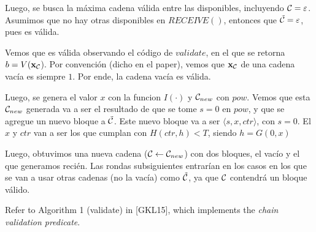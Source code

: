\documentclass[12pt,addpoints,answers]{exam}
\begin{document}
\begin{questions}
\begin{solution}
  Luego, se busca la máxima cadena válida entre las disponibles, incluyendo ${\cal C} = \varepsilon$. Asumimos que no hay otras disponibles en $RECEIVE()$, 
  entonces que ${\tilde {\cal C}} = \varepsilon$, pues es válida.

  Vemos que es válida observando el código de $validate$, en el que se retorna $ b = V(\textbf{x}_{\cal C}$). Por convención (dicho en el paper), vemos que $\textbf{x}_{\cal C}$ de una cadena vacía es siempre $1$.
  Por ende, la cadena vacía es válida.

  Luego, se genera el valor $x$ con la funcion $I(\cdot)$ y ${\cal C}_{new}$ con $pow$.
  Vemos que esta ${\cal C}_{new}$ generada va a ser el resultado de que se tome $s = 0$ en $pow$, y que se agregue un
  nuevo bloque a ${\tilde {\cal C}}$. Este nuevo bloque va a ser $\langle s, x, ctr \rangle$, con $s = 0$.
  El $x$ y $ctr$ van a ser los que cumplan con $H(ctr, h) < T$, siendo $h = G(0, x)$

  Luego, obtuvimos una nueva cadena (${\cal C} \leftarrow {\cal C}_{new}$) con dos bloques, el vacío y el que generamos recién.
  Las rondas subsiguientes entrarían en los casos en los que se van a usar otras cadenas (no la vacía) como ${\tilde{\cal C}}$, ya que
  ${\cal C}$ contendrá un bloque válido.

  
\end{solution}

\newpage

\question Refer to Algorithm 1 ({\sf validate}) in [GKL15], which implements the {\em chain validation predicate}. 

\end{questions}
\end{document}

